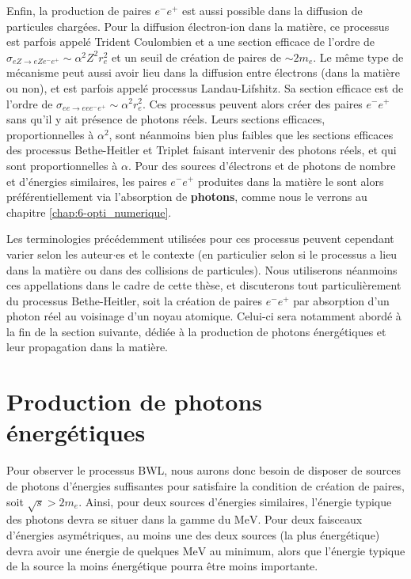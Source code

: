 \begin{refsection}
Enfin, la production de paires $e^-e^+$ est aussi possible dans la diffusion de particules chargées. Pour la diffusion électron-ion dans la matière, ce processus est parfois appelé Trident Coulombien et a une section efficace de l'ordre de \parencite{ruffini_2010} $\sigma_{e Z \to e Z e^- e^+} \sim \alpha^2 Z^2 r_e^2$ et un seuil de création de paires de $\sim 2 m_e$. Le même type de mécanisme peut aussi avoir lieu dans la diffusion entre électrons (dans la matière ou non), et est parfois appelé processus Landau-Lifshitz. Sa section efficace est de l'ordre de \parencite{landau_1934} $\sigma_{e e \to e e e^- e^+} \sim \alpha^2 r_e^2$. Ces processus peuvent alors créer des paires $e^-e^+$ sans qu'il y ait présence de photons réels. Leurs sections efficaces, proportionnelles à $\alpha^2$, sont néanmoins bien plus faibles que les sections efficaces des processus Bethe-Heitler et Triplet faisant intervenir des photons réels, et qui sont proportionnelles à $\alpha$. Pour des sources d'électrons et de photons de nombre et d'énergies similaires, les paires $e^-e^+$ produites dans la matière le sont alors préférentiellement via l'absorption de \textbf{photons}, comme nous le verrons au chapitre \ref{chap:6-opti_numerique}.


Les terminologies précédemment utilisées pour ces processus peuvent cependant varier selon les auteur$\cdot$es et le contexte (en particulier selon si le processus a lieu dans la matière ou dans des collisions de particules). Nous utiliserons néanmoins ces appellations dans le cadre de cette thèse, et discuterons tout particulièrement du processus Bethe-Heitler, soit la création de paires $e^-e^+$ par absorption d'un photon réel au voisinage d'un noyau atomique. Celui-ci sera notamment abordé à la fin de la section suivante, dédiée à la production de photons énergétiques et leur propagation dans la matière.


\section{Production de photons énergétiques}

Pour observer le processus BWL, nous aurons donc besoin de disposer de sources de photons d'énergies suffisantes pour satisfaire la condition de création de paires, soit $\sqrt{s}>2 m_e$. Ainsi, pour deux sources d'énergies similaires, l'énergie typique des photons devra se situer dans la gamme du $\si{\MeV}$. Pour deux faisceaux d'énergies asymétriques, au moins une des deux sources (la plus énergétique) devra avoir une énergie de quelques $\si{\MeV}$ au minimum, alors que l'énergie typique de la source la moins énergétique pourra être moins importante.


\end{refsection}
